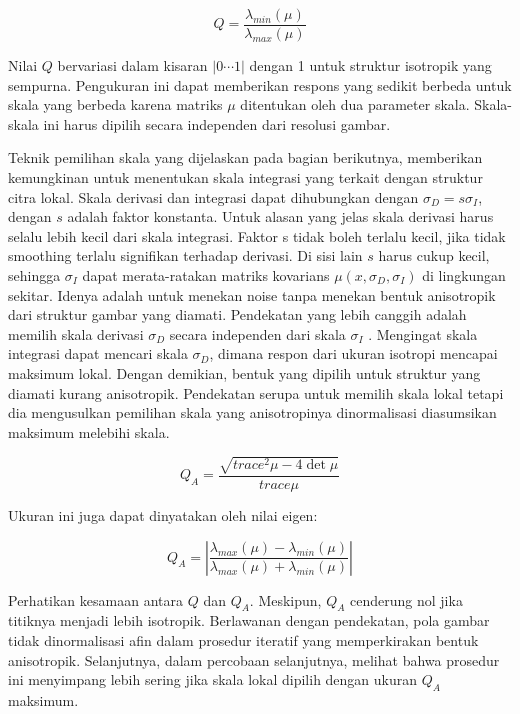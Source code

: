 \begin{equation}
  Q = \frac{\lambda_{min}(\mu)}{\lambda_{max}(\mu)}
\end{equation}

Nilai \(Q\) bervariasi dalam kisaran \(\left| 0 \cdots  1\right|\) dengan 1 untuk struktur isotropik yang sempurna. 
Pengukuran ini dapat memberikan respons yang sedikit berbeda untuk skala yang berbeda karena matriks \(\mu\) 
ditentukan oleh dua parameter skala. Skala-skala ini harus dipilih secara independen dari resolusi gambar.

Teknik pemilihan skala yang dijelaskan pada bagian berikutnya, memberikan kemungkinan untuk menentukan skala integrasi yang 
terkait dengan struktur citra lokal. Skala derivasi dan integrasi dapat dihubungkan dengan \(\sigma_{D}=s \sigma_{I}\), dengan \(s\) adalah 
faktor konstanta. Untuk alasan yang jelas skala derivasi harus selalu lebih kecil dari skala integrasi. Faktor s tidak boleh 
terlalu kecil, jika tidak smoothing terlalu signifikan terhadap derivasi. Di sisi lain \(s\) harus cukup kecil, sehingga \(\sigma_{I}\) dapat 
merata-ratakan matriks kovarians \(\mu(x,\sigma_{D},\sigma_{I})\) di lingkungan sekitar. Idenya adalah untuk menekan noise tanpa menekan bentuk 
anisotropik dari struktur gambar yang diamati. Pendekatan yang lebih canggih adalah memilih skala derivasi \(\sigma_{D}\) secara independen 
dari skala \(\sigma_{I}\) . Mengingat skala integrasi  dapat mencari skala \(\sigma_{D}\), dimana respon dari ukuran isotropi mencapai maksimum lokal. 
Dengan demikian, bentuk yang dipilih untuk struktur yang diamati kurang anisotropik. Pendekatan serupa untuk memilih skala lokal tetapi dia mengusulkan pemilihan skala yang anisotropinya dinormalisasi diasumsikan 
maksimum melebihi skala.

\begin{equation}
  Q_{A} = \frac{\sqrt{trace^{2}\mu - 4\det\mu}}{trace\mu}
\end{equation}

Ukuran ini juga dapat dinyatakan oleh nilai eigen:

\begin{equation*}
  Q_{A} = \left\lvert \frac{\lambda_{max}(\mu) - \lambda_{min}(\mu)}{\lambda_{max}(\mu) + \lambda_{min}(\mu)}\right\rvert 
\end{equation*}

Perhatikan kesamaan antara \(Q\) dan \(Q_{A}\). Meskipun, \(Q_{A}\) cenderung nol jika titiknya menjadi lebih isotropik. 
Berlawanan dengan pendekatan, pola gambar tidak dinormalisasi afin dalam prosedur iteratif yang memperkirakan bentuk anisotropik. 
Selanjutnya, dalam percobaan selanjutnya, melihat bahwa prosedur ini menyimpang lebih sering jika skala lokal dipilih dengan ukuran \(Q_{A}\) maksimum.

